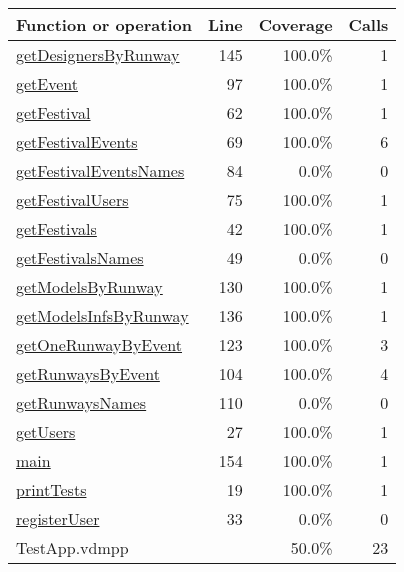 \begin{longtable}{|l|r|r|r|}
\hline
Function or operation & Line & Coverage & Calls \\
\hline
\hline
\hyperref[getDesignersByRunway:145]{getDesignersByRunway} & 145&100.0\% & 1 \\
\hline
\hyperref[getEvent:97]{getEvent} & 97&100.0\% & 1 \\
\hline
\hyperref[getFestival:62]{getFestival} & 62&100.0\% & 1 \\
\hline
\hyperref[getFestivalEvents:69]{getFestivalEvents} & 69&100.0\% & 6 \\
\hline
\hyperref[getFestivalEventsNames:84]{getFestivalEventsNames} & 84&0.0\% & 0 \\
\hline
\hyperref[getFestivalUsers:75]{getFestivalUsers} & 75&100.0\% & 1 \\
\hline
\hyperref[getFestivals:42]{getFestivals} & 42&100.0\% & 1 \\
\hline
\hyperref[getFestivalsNames:49]{getFestivalsNames} & 49&0.0\% & 0 \\
\hline
\hyperref[getModelsByRunway:130]{getModelsByRunway} & 130&100.0\% & 1 \\
\hline
\hyperref[getModelsInfsByRunway:136]{getModelsInfsByRunway} & 136&100.0\% & 1 \\
\hline
\hyperref[getOneRunwayByEvent:123]{getOneRunwayByEvent} & 123&100.0\% & 3 \\
\hline
\hyperref[getRunwaysByEvent:104]{getRunwaysByEvent} & 104&100.0\% & 4 \\
\hline
\hyperref[getRunwaysNames:110]{getRunwaysNames} & 110&0.0\% & 0 \\
\hline
\hyperref[getUsers:27]{getUsers} & 27&100.0\% & 1 \\
\hline
\hyperref[main:154]{main} & 154&100.0\% & 1 \\
\hline
\hyperref[printTests:19]{printTests} & 19&100.0\% & 1 \\
\hline
\hyperref[registerUser:33]{registerUser} & 33&0.0\% & 0 \\
\hline
\hline
TestApp.vdmpp & & 50.0\% & 23 \\
\hline
\end{longtable}

